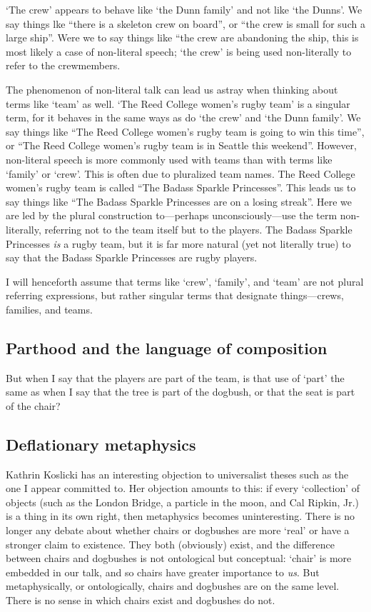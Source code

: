 \documentclass[11pt]{article}
\begin{document}
\begin{spacing}{1.25}
`The crew' appears to behave like `the Dunn family' and not like `the
Dunns'.  We say things lke ``there is a skeleton crew on board'', or
``the crew is small for such a large ship''.  Were we to say things
like ``the crew are abandoning the ship, this is most likely a case of
non-literal speech; `the crew' is being used non-literally to refer to
the crewmembers.

The phenomenon of non-literal talk can lead us astray when thinking
about terms like `team' as well.  `The Reed College women's rugby
team' is a singular term, for it behaves in the same ways as do `the
crew' and `the Dunn family'.  We say things like ``The Reed College
women's rugby team is going to win this time'', or ``The Reed College
women's rugby team is in Seattle this weekend''.  However, non-literal
speech is more commonly used with teams than with terms like `family'
or `crew'.  This is often due to pluralized team names.  The Reed
College women's rugby team is called ``The Badass Sparkle
Princesses''.  This leads us to say things like ``The Badass Sparkle
Princesses are on a losing streak''.  Here we are led by the plural
construction to---perhaps unconsciously---use the term non-literally,
referring not to the team itself but to the players.  The Badass
Sparkle Princesses {\em is} a rugby team, but it is far more natural
(yet not literally true) to say that the Badass Sparkle Princesses are
rugby players.

I will henceforth assume that terms like `crew', `family', and `team'
are not plural referring expressions, but rather singular terms that
designate things---crews, families, and teams.

\subsection{Parthood and the language of composition}
But when I say that the players are part of the team, is that use of
`part' the same as when I say that the tree is part of the dogbush, or
that the seat is part of the chair?

\subsection{Deflationary metaphysics}
\label{deflate}
Kathrin Koslicki has an interesting objection to universalist theses
such as the one I appear committed to.  Her objection amounts to this:
if every `collection' of objects (such as the London Bridge, a
particle in the moon, and Cal Ripkin, Jr.) is a thing in its own
right, then metaphysics becomes uninteresting.  There is no longer any
debate about whether chairs or dogbushes are more `real' or have a
stronger claim to existence.  They both (obviously) exist, and the
difference between chairs and dogbushes is not ontological but
conceptual: `chair' is more embedded in our talk, and so chairs have
greater importance to {\em us}.  But metaphysically, or ontologically,
chairs and dogbushes are on the same level.  There is no sense in
which chairs exist and dogbushes do not.


\end{spacing}
\end{document}
